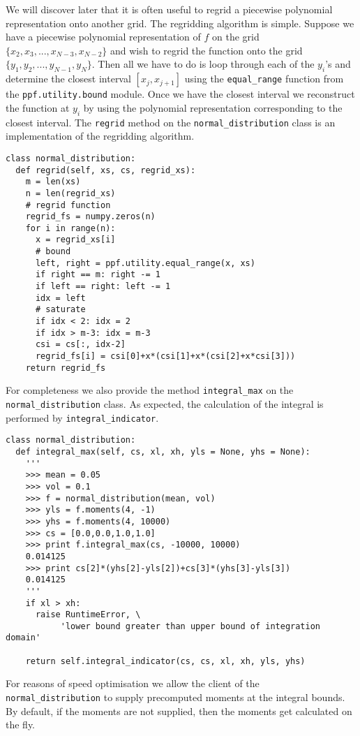 We will discover later that it is often useful to regrid a piecewise
polynomial representation onto another grid. The regridding algorithm
is simple. Suppose we have a piecewise polynomial representation of
$f$ on the grid $\{x_2,x_3,...,x_{N-3},x_{N-2}\}$ and wish to regrid
the function onto the grid $\{y_1, y_2, ..., y_{N-1}, y_N\}$. Then all
we have to do is loop through each of the $y_i$'s and determine the
closest interval $\left[x_j, x_{j+1}\right]$ using the
\verb|equal_range| function from the \verb|ppf.utility.bound| module.
Once we have the closest interval we reconstruct the function at $y_i$
by using the polynomial representation corresponding to the closest
interval. The \verb|regrid| method on the \verb|normal_distribution| class 
is an implementation of the regridding algorithm.
\begin{verbatim}
class normal_distribution:
  def regrid(self, xs, cs, regrid_xs):
    m = len(xs)
    n = len(regrid_xs)
    # regrid function
    regrid_fs = numpy.zeros(n)
    for i in range(n):
      x = regrid_xs[i]
      # bound
      left, right = ppf.utility.equal_range(x, xs)
      if right == m: right -= 1
      if left == right: left -= 1
      idx = left
      # saturate
      if idx < 2: idx = 2
      if idx > m-3: idx = m-3
      csi = cs[:, idx-2]
      regrid_fs[i] = csi[0]+x*(csi[1]+x*(csi[2]+x*csi[3]))
    return regrid_fs 
\end{verbatim}
For completeness we also provide the method \verb|integral_max| on the 
\verb|normal_distribution| class. As expected, the calculation of the 
integral is performed by \verb|integral_indicator|.
\begin{verbatim}    
class normal_distribution:
  def integral_max(self, cs, xl, xh, yls = None, yhs = None):
    '''
    >>> mean = 0.05
    >>> vol = 0.1
    >>> f = normal_distribution(mean, vol)
    >>> yls = f.moments(4, -1)
    >>> yhs = f.moments(4, 10000)
    >>> cs = [0.0,0.0,1.0,1.0]
    >>> print f.integral_max(cs, -10000, 10000)
    0.014125
    >>> print cs[2]*(yhs[2]-yls[2])+cs[3]*(yhs[3]-yls[3])
    0.014125
    '''
    if xl > xh:
      raise RuntimeError, \
           'lower bound greater than upper bound of integration domain'
        
    return self.integral_indicator(cs, cs, xl, xh, yls, yhs)
\end{verbatim}

For reasons of speed optimisation we allow the client of the
\verb|normal_distribution| to supply precomputed moments at the
integral bounds. By default, if the moments are not supplied, then the
moments get calculated on the fly.

